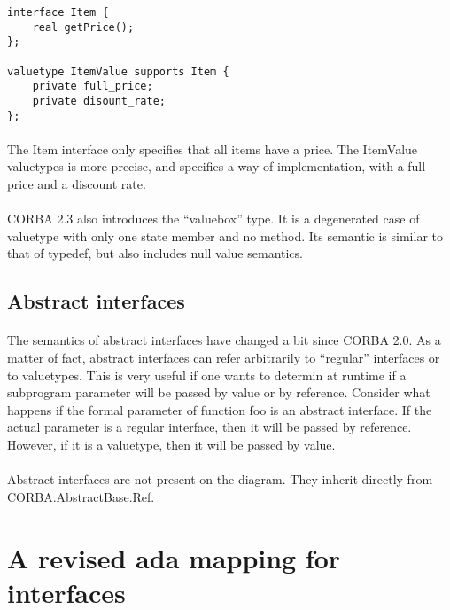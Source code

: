 \begin{verbatim}
interface Item {
	real getPrice();
};

valuetype ItemValue supports Item {
	private full_price;
	private disount_rate;
};
\end{verbatim}
\paragraph{}The Item interface only specifies that all items have a price. The
ItemValue valuetypes is more precise, and specifies a way of
implementation, with a full price and a discount rate.

\paragraph{}CORBA 2.3 also introduces the ``valuebox'' type. It is a
degenerated case of valuetype with only one state member and no
method. Its semantic is similar to that of typedef, but also includes
null value semantics.


\subsection{Abstract interfaces}
\paragraph{}The semantics of abstract interfaces have changed a bit since CORBA
2.0. As a matter of fact, abstract interfaces can refer arbitrarily to
``regular'' interfaces or to valuetypes. This is very useful if one
wants to determin at runtime if a subprogram parameter will be passed
by value or by reference. Consider what happens if the formal
parameter of function foo is an abstract interface. If the actual
parameter is a regular interface, then it will be passed by
reference. However, if it is a valuetype, then it will be passed by
value.

\paragraph{}Abstract interfaces are not present on the diagram. They inherit
directly from CORBA.AbstractBase.Ref.


\section{A revised ada mapping for interfaces}

